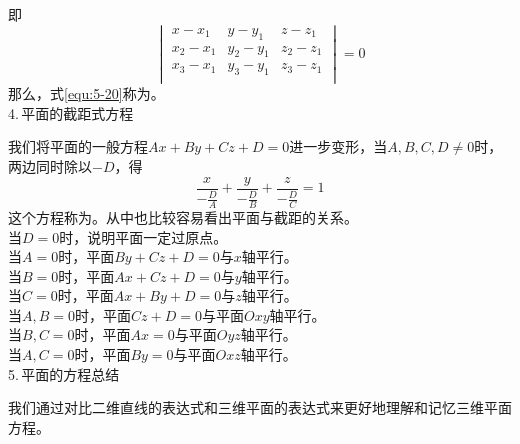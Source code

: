 即\begin{equation}
	\begin{vmatrix}
		x-x_1 & y-y_1 & z-z_1\\
		x_2-x_1 & y_2-y_1 & z_2-z_1\\
		x_3-x_1 & y_3-y_1 & z_3-z_1\\
	\end{vmatrix}=0
\label{equ:5-20}
\end{equation}
那么，式\eqref{equ:5-20}称为。\\
4.$\,$平面的截距式方程
\par 我们将平面的一般方程$Ax+By+Cz+D=0$进一步变形，当$A,B,C,D\neq0$时，两边同时除以$-D$，得
\begin{equation}
	\displaystyle \frac{x}{-\frac{D}{A}}+\frac{y}{-\frac{D}{B}}+\frac{z}{-\frac{D}{C}}
=1\end{equation}
这个方程称为。从中也比较容易看出平面与截距的关系。\\
当$D=0$时，说明平面一定过原点。\\
当$A=0$时，平面$By+Cz+D=0$与$x$轴平行。\\
当$B=0$时，平面$Ax+Cz+D=0$与$y$轴平行。\\
当$C=0$时，平面$Ax+By+D=0$与$z$轴平行。\\
当$A,B=0$时，平面$Cz+D=0$与平面$Oxy$轴平行。\\
当$B,C=0$时，平面$Ax=0$与平面$Oyz$轴平行。\\
当$A,C=0$时，平面$By=0$与平面$Oxz$轴平行。\\
5.$\,$平面的方程总结
\par 我们通过对比二维直线的表达式和三维平面的表达式来更好地理解和记忆三维平面方程。
\begin{table}[h]
	\centering
\end{table}
